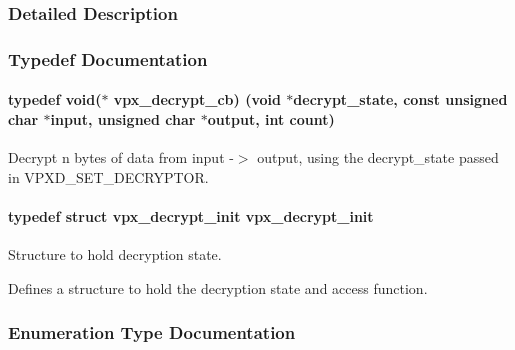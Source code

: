 \subsubsection{Detailed Description}


\subsubsection{Typedef Documentation}
\paragraph[{\texorpdfstring{vpx\+\_\+decrypt\+\_\+cb}{vpx_decrypt_cb}}]{\setlength{\rightskip}{0pt plus 5cm}typedef void($\ast$ vpx\+\_\+decrypt\+\_\+cb) (void $\ast$decrypt\+\_\+state, const unsigned char $\ast$input, unsigned char $\ast$output, int count)}\hypertarget{group__vp8__decoder_ga10cdcbbc04aa831558688f4a4149fcbd}{}\label{group__vp8__decoder_ga10cdcbbc04aa831558688f4a4149fcbd}
Decrypt n bytes of data from input -\/$>$ output, using the decrypt\+\_\+state passed in V\+P\+X\+D\+\_\+\+S\+E\+T\+\_\+\+D\+E\+C\+R\+Y\+P\+T\+OR. 
\paragraph[{\texorpdfstring{vpx\+\_\+decrypt\+\_\+init}{vpx_decrypt_init}}]{\setlength{\rightskip}{0pt plus 5cm}typedef struct {\bf vpx\+\_\+decrypt\+\_\+init}  {\bf vpx\+\_\+decrypt\+\_\+init}}\hypertarget{group__vp8__decoder_gaa55171d8fa453260b1375dba87524b6a}{}\label{group__vp8__decoder_gaa55171d8fa453260b1375dba87524b6a}


Structure to hold decryption state. 

Defines a structure to hold the decryption state and access function. 

\subsubsection{Enumeration Type Documentation}
